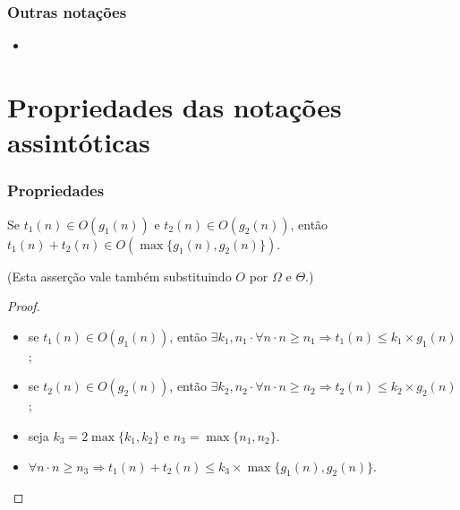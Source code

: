 \documentclass{beamer}
\begin{document}
\begin{frame}
\frametitle{Outras notações}

\begin{itemize}
\item 
{}
\pause
{}
\pause
{}
\end{itemize}

\end{frame}

\section{Propriedades das notações assintóticas}

\begin{frame}
\frametitle{Propriedades}
\begin{theorem}
\label{teo:soma-sup}
Se $t_1(n) \in O(g_1(n))$ e $t_2(n) \in O(g_2(n))$, então
$t_1(n) + t_2(n) \in O(\max\{g_1(n), g_2(n)\})$.

(Esta asserção vale também substituindo $O$ por $\Omega$ e $\Theta$.)
\end{theorem}
\begin{proof}
\begin{itemize}
\item se $t_1(n) \in O(g_1(n))$, então $\exists k_1, n_1 \cdot \forall n \cdot n \ge n_1 \Rightarrow t_1(n) \le k_1 \times g_1(n)$;
\item se $t_2(n) \in O(g_2(n))$, então $\exists k_2, n_2 \cdot \forall n \cdot n \ge n_2 \Rightarrow t_2(n) \le k_2 \times g_2(n)$;
\item seja $k_3 = 2 \max\{k_1, k_2\}$ e $n_3 = \max\{n_1, n_2\}$.
\item $\forall n \cdot n \ge n_3 \Rightarrow t_1(n) + t_2(n) \le k_3 \times \max\{g_1(n), g_2(n)\}$.
\end{itemize}
\end{proof}
\end{frame}
\end{document}
